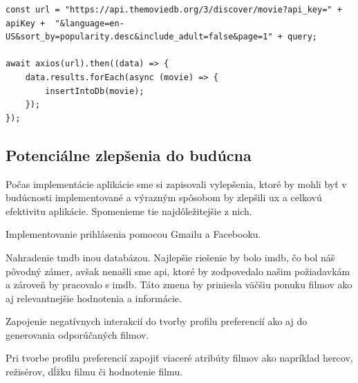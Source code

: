 \begin{lstlisting}[caption={Get request na TMDb}, label={appjs-navDone}] 
const url = "https://api.themoviedb.org/3/discover/movie?api_key=" + apiKey +  "&language=en-US&sort_by=popularity.desc&include_adult=false&page=1" + query;

await axios(url).then((data) => {
    data.results.forEach(async (movie) => {
        insertIntoDb(movie);
    });
});

\end{lstlisting}
\subsection{Potenciálne zlepšenia do budúcna}
Počas implementácie aplikácie sme si zapisovali vylepšenia, ktoré by mohli byť v budúcnosti implementované a výrazným spôsobom by zlepšili \acrshort{ux} a celkovú efektivitu aplikácie. Spomenieme tie najdôležitejšie z nich.
\begin{itemize}
{\item Implementovanie prihlásenia pomocou Gmailu a Facebooku.}
{\item Nahradenie \acrshort{tmdb} inou databázou. Najlepšie riešenie by bolo \acrshort{imdb}, čo bol náš pôvodný zámer, avšak nenašli sme \acrshort{api}, ktoré by zodpovedalo našim požiadavkám a zároveň by pracovalo s \acrshort{imdb}. Táto zmena by priniesla väčšiu ponuku filmov ako aj relevantnejšie hodnotenia a informácie.}
{\item Zapojenie negatívnych interakcií do tvorby profilu preferencií ako aj do generovania odporúčaných filmov.}
{\item Pri tvorbe profilu preferencií zapojiť viaceré atribúty filmov ako napríklad hercov, režisérov, dĺžku filmu či hodnotenie filmu.}
\end{itemize}









